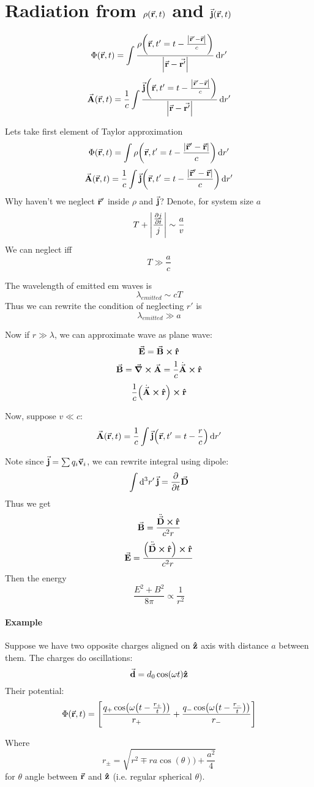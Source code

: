 \section{Radiation from $\rho(\va{r},t)$ and $\va{j}(\va{r},t)$}
$$\Phi(\va{r},t) = \int \frac{\rho\qty(\va{r},t'=t-\frac{ \abs{\va{r}' - \va{r}}}{c})}{\abs{\va{r}-\va{r'}}} \dd{r'}$$
$$\va{A}(\va{r},t) = \frac{1}{c} \int \frac{\va{j}\qty(\va{r},t'=t-\frac{ \abs{\va{r}' - \va{r}}}{c})}{\abs{\va{r}-\va{r'}}} \dd{r'}$$

Lets take first element of Taylor approximation
$$\Phi(\va{r},t) = \int \rho\qty(\va{r},t'=t-\frac{ \abs{\va{r}' - \va{r}}}{c}) \dd{r'}$$
$$\va{A}(\va{r},t) = \frac{1}{c} \int\va{j}\qty(\va{r},t'=t-\frac{ \abs{\va{r}' - \va{r}}}{c}) \dd{r'}$$
Why haven't we neglect $\va{r}'$ inside $\rho$ and $\va{j}$?
Denote, for system size $a$
$$T+\abs{\frac{\pdv{j}{t}}{j}} \sim \frac{a}{v} $$
We can neglect iff $$T\gg \frac{a}{c}$$

The wavelength of emitted em waves is
$$\lambda_{emitted} \sim cT$$
Thus we can rewrite the condition of neglecting $r'$ is
$$\lambda_{emitted} \gg a$$


Now if $r\gg \lambda$, we can approximate wave as plane wave:
$$\va{E} = \va{B} \cross \vu{r}$$
$$\va{B} = \curl{\va{A}} = \frac{1}{c} \dot{\va{A}} \cross \vu{r}$$
$$ \frac{1}{c} \qty(\dot{\va{A}} \cross \vu{r}) \cross \vu{r}$$

Now, suppose $v\ll c$:
$$\va{A}(\va{r},t) = \frac{1}{c} \int\va{j}\qty(\va{r},t'=t-\frac{r }{c}) \dd{r'}$$

Note since $\va{j} = \sum q_i \va{v}_i$, we can rewrite integral using dipole:
$$\int \dd[3]{r'} \va{j} = \pdv{t} \va{D}$$
Thus we get
$$\va{B}= \frac{\ddot{\va{D}}\cross \vu{r}}{c^2r}$$
$$\va{E}= \frac{\qty(\ddot{\va{D}}\cross \vu{r})\cross \vu{r}}{c^2r}$$
Then the energy
$$\frac{E^2+B^2}{8\pi} \propto \frac{1}{r^2}$$

\paragraph{Example} %
Suppose we have two opposite charges aligned on $\vu{z}$ axis with distance $a$ between them. The charges do oscillations:
$$\va{d} = d_0 \cos(\omega t) \vu{z}$$
 Their potential:
$$\Phi(\va{r},t) = \qty[\frac{q_+ \cos(\omega\qty(t-\frac{r_+}{t}))}{r_+}+\frac{q_- \cos(\omega\qty(t-\frac{r_-}{t}))}{r_-}]$$

Where
$$r_{\pm} = \sqrt{r^2 \mp ra\cos(\theta))+\frac{a^2}{4}}$$
for $\theta$ angle between $\va{r}$ and $\vu{z}$ (i.e. regular spherical $\theta$).

